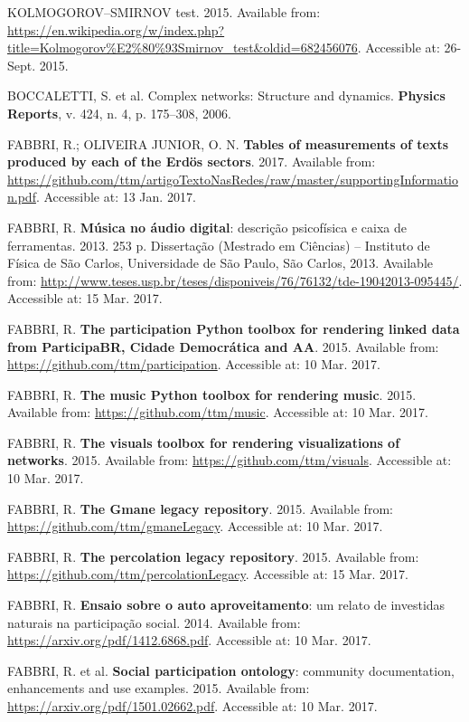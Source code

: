 \documentclass[
12pt,		%
openright,	%
twoside,  %
a4paper,			%
chapter=TITLE,		%
english,			%
french,				%
spanish,			%
brazil				%
]{USPSC}
\begin{document}
\begin{thebibliography}{999}
	KOLMOGOROV–SMIRNOV test. 2015. Available from: \url{https://en.wikipedia.org/w/index.php?title=Kolmogorov%E2%80%93Smirnov_test&oldid=682456076}. Accessible at: 26-Sept. 2015. 

	BOCCALETTI, S. et al. Complex networks: Structure and dynamics. \textbf{Physics Reports}, v. 424, n. 4, p. 175–308, 2006.

	FABBRI, R.; OLIVEIRA JUNIOR, O. N. \textbf{Tables of measurements of texts produced by each of the Erdös sectors}. 2017. Available from: \url{https://github.com/ttm/artigoTextoNasRedes/raw/master/supportingInformation.pdf}. Accessible at: 13 Jan. 2017.

	FABBRI, R. \textbf{Música no áudio digital}: descrição psicofísica e caixa de ferramentas. 2013. 253 p. Dissertação (Mestrado em Ciências) – Instituto de Física de São Carlos, Universidade de São Paulo, São Carlos, 2013. Available from: \url{http://www.teses.usp.br/teses/disponiveis/76/76132/tde-19042013-095445/}. Accessible at: 15 Mar. 2017.

	FABBRI, R. \textbf{The participation Python toolbox for rendering linked data from ParticipaBR, Cidade Democrática and AA}. 2015. Available from: \url{https://github.com/ttm/participation}. Accessible at: 10 Mar. 2017.

	FABBRI, R. \textbf{The music Python toolbox for rendering music}. 2015. Available from: \url{https://github.com/ttm/music}. Accessible at: 10 Mar. 2017.

	FABBRI, R. \textbf{The visuals toolbox for rendering visualizations of networks}. 2015. Available from: \url{https://github.com/ttm/visuals}. Accessible at: 10 Mar. 2017.

	FABBRI, R. \textbf{The Gmane legacy repository}. 2015. Available from: \url{https://github.com/ttm/gmaneLegacy}. Accessible at: 10 Mar. 2017.

	FABBRI, R. \textbf{The percolation legacy repository}. 2015. Available from: \url{https://github.com/ttm/percolationLegacy}. Accessible at: 15 Mar. 2017.

	FABBRI, R. \textbf{Ensaio sobre o auto aproveitamento}: um relato de investidas naturais na participação social. 2014. Available from: \url{https://arxiv.org/pdf/1412.6868.pdf}. Accessible at: 10 Mar. 2017.

	FABBRI, R. et al. \textbf{Social participation ontology}: community documentation, enhancements and use examples. 2015. Available from: \url{https://arxiv.org/pdf/1501.02662.pdf}. Accessible at: 10 Mar. 2017.


\end{thebibliography}
\end{document}
